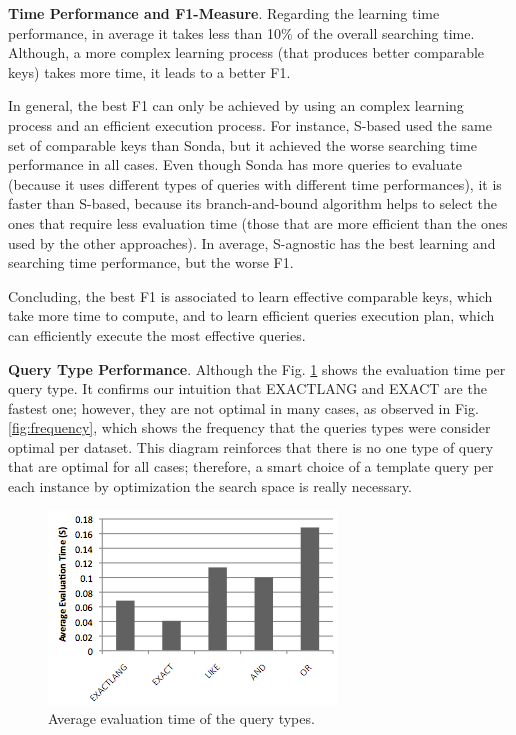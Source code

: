 \textbf{Time Performance and F1-Measure}. Regarding the learning time performance, in average it takes less than 10\% of the overall searching time. Although, a more complex learning process (that produces better comparable keys) takes more time, it leads to a better F1. 

In general, the best F1 can only be achieved by using an complex learning process and an efficient execution process. For instance, S-based used the same set of comparable keys than Sonda, but it achieved the worse searching time performance in all cases. Even though Sonda has more queries to evaluate (because it uses different types of queries with different time performances), it is faster than S-based, because its  branch-and-bound algorithm helps to select the ones that require less evaluation time (those that are more efficient than the ones used by the other approaches).  In average, S-agnostic has the best learning and searching time performance, but the worse F1. 

Concluding, the best F1 is associated to learn effective comparable keys, which take more time to compute, and to learn efficient queries execution plan, which can efficiently execute the most effective queries. 
 
 
 \textbf{Query Type Performance}.  Although the 
 Fig. \ref{fig:time} shows the evaluation time per query type. It confirms our intuition that EXACTLANG and EXACT are the fastest one; however, they are not optimal in many cases, as observed in Fig. \ref{fig:frequency}, which shows the frequency that the queries types were consider optimal per dataset. This diagram reinforces that there is no one type of query that are optimal for all cases; therefore, a smart choice of a template query per each instance by optimization the search space is really necessary. 
 \begin{figure} [h]
\vspace{-10pt}
\centering
\includegraphics[scale=0.5]{p9.png}
\caption{Average evaluation time of the query types.} 
\vspace{-10pt}
\label{fig:time}
\end{figure} 

